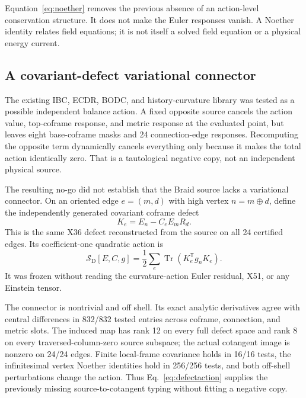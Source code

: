 \documentclass[11pt]{article}
\theoremstyle{definition}
\theoremstyle{remark}
\newcommand{\Tr}{\operatorname{Tr}}
\begin{document}
Equation~\eqref{eq:noether} removes the previous absence of an action-level conservation structure. It does not make the Euler responses vanish. A Noether identity relates field equations; it is not itself a solved field equation or a physical energy current.

\subsection{A covariant-defect variational connector}

The existing IBC, ECDR, BODC, and history-curvature library was tested as a possible independent balance action. A fixed opposite source cancels the action value, top-coframe response, and metric response at the evaluated point, but leaves eight base-coframe masks and 24 connection-edge responses. Recomputing the opposite term dynamically cancels everything only because it makes the total action identically zero. That is a tautological negative copy, not an independent physical source.

The resulting no-go did not establish that the Braid source lacks a variational connector. On an oriented edge $e=(m,d)$ with high vertex $n=m\oplus d$, define the independently generated covariant coframe defect
\begin{equation}\label{eq:defectconnector}
 K_e=E_n-C_eE_mR_d.
\end{equation}
This is the same X36 defect reconstructed from the source on all 24 certified edges. Its coefficient-one quadratic action is
\begin{equation}\label{eq:defectaction}
 \mathcal S_{\mathrm D}[E,C,g]
 =\frac12\sum_e\Tr\!\left(K_e^{\mathsf T}g_nK_e\right).
\end{equation}
It was frozen without reading the curvature-action Euler residual, X51, or any Einstein tensor.

The connector is nontrivial and off shell. Its exact analytic derivatives agree with central differences in 832/832 tested entries across coframe, connection, and metric slots. The induced map has rank 12 on every full defect space and rank 8 on every traversed-column-zero source subspace; the actual cotangent image is nonzero on 24/24 edges. Finite local-frame covariance holds in 16/16 tests, the infinitesimal vertex Noether identities hold in 256/256 tests, and both off-shell perturbations change the action. Thus Eq.~\eqref{eq:defectaction} supplies the previously missing source-to-cotangent typing without fitting a negative copy.
\end{document}
